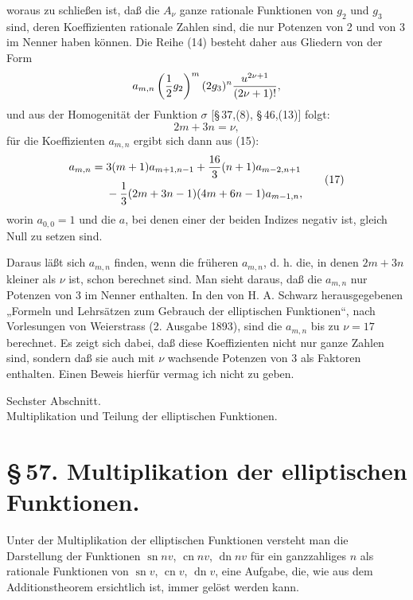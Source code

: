 \documentclass[11pt]{article}
\providecommand{\sn}{\operatorname{sn}}
\providecommand{\cn}{\operatorname{cn}}
\providecommand{\dn}{\operatorname{dn}}
\begin{document}
woraus zu schließen ist, daß die $A_\nu$ ganze rationale Funktionen von $g_2$ und $g_3$ sind, deren Koeffizienten rationale Zahlen sind, die nur Potenzen von 2 und von 3 im Nenner haben können. Die Reihe (14) besteht daher aus Gliedern von der Form
\[
a_{m,n}\left({1\over2}g_2\right)^m(2g_3)^n{u^{2\nu+1}\over(2\nu+1)!},
\]
und aus der Homogenität der Funktion $\sigma$ [\S\,37,(8), \S\,46,(13)] folgt:
\begin{equation}
2m+3n=\nu,
\tag{16}
\end{equation}
für die Koeffizienten $a_{m,n}$ ergibt sich dann aus (15):
\begin{equation}
\begin{aligned}
a_{m,n}={}&3(m+1)a_{m+1,n-1}+{16\over3}(n+1)a_{m-2,n+1}\\
&-{1\over3}(2m+3n-1)(4m+6n-1)a_{m-1,n},
\end{aligned}
\tag{17}
\end{equation}
worin $a_{0,0}=1$ und die $a$, bei denen einer der beiden Indizes negativ ist, gleich Null zu setzen sind.

Daraus läßt sich $a_{m,n}$ finden, wenn die früheren $a_{m,n}$, d. h. die, in denen $2m+3n$ kleiner als $\nu$ ist, schon berechnet sind. Man sieht daraus, daß die $a_{m,n}$ nur Potenzen von 3 im Nenner enthalten. In den von H. A. Schwarz herausgegebenen „Formeln und Lehrsätzen zum Gebrauch der elliptischen Funktionen“, nach Vorlesungen von Weierstrass (2. Ausgabe 1893), sind die $a_{m,n}$ bis zu $\nu=17$ berechnet. Es zeigt sich dabei, daß diese Koeffizienten nicht nur ganze Zahlen sind, sondern daß sie auch mit $\nu$ wachsende Potenzen von 3 als Faktoren enthalten. Einen Beweis hierfür vermag ich nicht zu geben.




\begin{center}
{\large Sechster Abschnitt.}\\[0.7em]
{\Large Multiplikation und Teilung der elliptischen Funktionen.}
\end{center}

\section*{\S\,57. Multiplikation der elliptischen Funktionen.}

Unter der Multiplikation der elliptischen Funktionen versteht man die Darstellung der Funktionen
$\sn n v$, $\cn n v$, $\dn n v$ für ein ganzzahliges $n$ als rationale Funktionen von
$\sn v$, $\cn v$, $\dn v$, eine Aufgabe, die, wie aus dem Additionstheorem ersichtlich ist,
immer gelöst werden kann.
\end{document}
